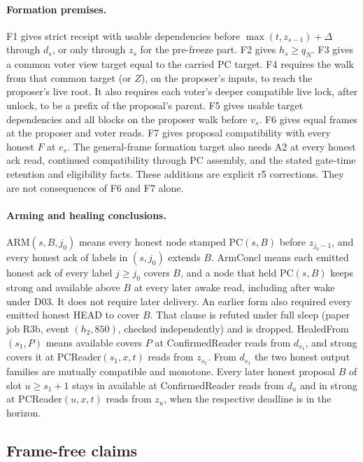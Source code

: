 \documentclass{article}
\begin{document}
\paragraph{Formation premises.}
F1 gives strict receipt with usable dependencies before
$\max(t,z_{s-1})+\Delta$ through $d_s$, or only through $z_s$ for the
pre-freeze part. F2 gives $h_s\geq q_N$.
F3 gives a common voter view target equal to the carried PC target.
F4 requires the walk from that common target (or $Z$), on the proposer's
inputs, to reach the proposer's live root. It also requires each voter's
deeper compatible live lock, after unlock, to be a prefix of the proposal's
parent. F5 gives usable target dependencies and all blocks on the proposer
walk before $v_s$. F6 gives equal frames at the proposer and voter reads.
F7 gives proposal compatibility with every honest $F$ at $e_s$.
The general-frame formation target also needs A2 at every honest ack read,
continued compatibility through PC assembly, and the stated gate-time
retention and eligibility facts. These additions are explicit r5 corrections.
They are not consequences of F6 and F7 alone.

\paragraph{Arming and healing conclusions.}
ARM$(s,B,j_0)$ means every honest node stamped PC$(s,B)$ before $z_{j_0-1}$,
and every honest ack of labels in $(s,j_0)$ extends $B$.
ArmConcl means each emitted honest ack of every label $j\geq j_0$ covers
$B$, and a node that held PC$(s,B)$ keeps strong and available above $B$
at every later awake read, including after wake under D03. It does not require later delivery.
An earlier form also required every emitted honest HEAD to cover $B$.
That clause is refuted under full sleep (paper job R3b, event $(h_2,850)$,
checked independently) and is dropped.
HealedFrom$(s_1,P)$ means available covers $P$ at ConfirmedReader reads
from $d_{s_1}$, and strong covers it at PCReader$(s_1,x,t)$ reads from $z_{s_1}$. From $d_{s_1}$ the two honest output families
are mutually compatible and monotone. Every later honest proposal $B$
of slot $u\geq s_1+1$ stays in available at ConfirmedReader reads from
$d_u$ and in strong at PCReader$(u,x,t)$ reads from $z_u$, when the
respective deadline is in the horizon.

\subsection{Frame-free claims}
\end{document}
